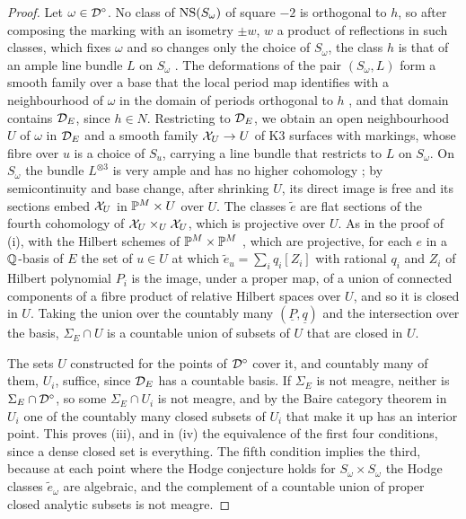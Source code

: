 \begin{proof}
Let $\omega\in\mathcal{D}^{\circ}$. No class of $\mathrm{NS}(S_{\omega})$ of square $-2$ is
orthogonal to $h$, so after composing the marking with an isometry $\pm w$,
$w$ a product of reflections in such classes, which fixes $\omega$ and so
changes only the choice of $S_{\omega}$, the class $h$ is that of an ample
line bundle $L$ on $S_{\omega}$ \cite[Ch.~8]{Huy16}. The deformations of the
pair $(S_{\omega},L)$ form a smooth family over a base that the local period
map identifies with a neighbourhood of $\omega$ in the domain of periods
orthogonal to $h$ \cite[Ch.~6]{Huy16}, and that domain contains $\mathcal{D}_{E}$,
since $h\in N$. Restricting to $\mathcal{D}_{E}$, we obtain an open neighbourhood $U$
of $\omega$ in $\mathcal{D}_{E}$ and a smooth family $\mathcal{X}_{U}\to U$ of K3 surfaces with
markings, whose fibre over $u$ is a choice of $S_{u}$, carrying a line bundle
that restricts to $L$ on $S_{\omega}$. On $S_{\omega}$ the bundle
$L^{\otimes3}$ is very ample and has no higher cohomology
\cite[Ch.~2]{Huy16}; by semicontinuity and base change, after shrinking $U$,
its direct image is free and its sections embed $\mathcal{X}_{U}$ in
$\mathbb{P}^{M}\times U$ over $U$. The classes $\tilde e$ are flat sections of the
fourth cohomology of $\mathcal{X}_{U}\times_{U}\mathcal{X}_{U}$, which is projective over $U$.
As in the proof of (i), with the Hilbert schemes of
$\mathbb{P}^{M}\times\mathbb{P}^{M}$ \cite{Gro61}, which are projective, for each $e$ in a
$\mathbb{Q}$-basis of $E$ the set of $u\in U$ at which
$\tilde e_{u}=\sum_{i}q_{i}[Z_{i}]$ with rational $q_{i}$ and $Z_{i}$ of
Hilbert polynomial $P_{i}$ is the image, under a proper map, of a union of
connected components of a fibre product of relative Hilbert spaces over $U$,
and so it is closed in $U$. Taking the union over the countably many
$(\underline{P},\underline{q})$ and the intersection over the basis,
$\Sigma_{E}\cap U$ is a countable union of subsets of $U$ that are closed in
$U$.

The sets $U$ constructed for the points of $\mathcal{D}^{\circ}$ cover it, and
countably many of them, $U_{i}$, suffice, since $\mathcal{D}_{E}$ has a countable
basis. If $\Sigma_{E}$ is not meagre, neither is
$\Sigma_{E}\cap\mathcal{D}^{\circ}$, so some $\Sigma_{E}\cap U_{i}$ is not meagre, and
by the Baire category theorem in $U_{i}$ one of the countably many closed
subsets of $U_{i}$ that make it up has an interior point. This proves (iii),
and in (iv) the equivalence of the first four conditions, since a dense
closed set is everything. The fifth condition implies the third, because at
each point where the Hodge conjecture holds for $S_{\omega}\times S_{\omega}$
the Hodge classes $\tilde e_{\omega}$ are algebraic, and the complement of a
countable union of proper closed analytic subsets is not meagre.


\end{proof}

